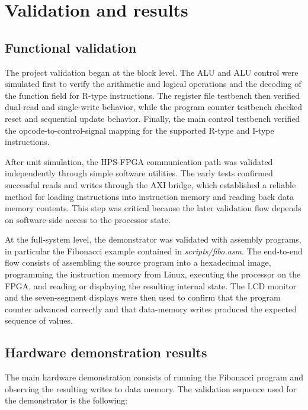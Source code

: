 \documentclass[a4paper,11pt]{scrartcl}
\begin{document}
\section{Validation and results}
\label{sec:org61e2172}
\subsection{Functional validation}
\label{sec:org949a2f6}

The project validation began at the block level. The ALU and ALU control were simulated first to verify the arithmetic and logical operations and the decoding of the function field for R-type instructions. The register file testbench then verified dual-read and single-write behavior, while the program counter testbench checked reset and sequential update behavior. Finally, the main control testbench verified the opcode-to-control-signal mapping for the supported R-type and I-type instructions.

After unit simulation, the HPS-FPGA communication path was validated independently through simple software utilities. The early tests confirmed successful reads and writes through the AXI bridge, which established a reliable method for loading instructions into instruction memory and reading back data memory contents. This step was critical because the later validation flow depends on software-side access to the processor state.

At the full-system level, the demonstrator was validated with assembly programs, in particular the Fibonacci example contained in \emph{scripts/fibo.asm}. The end-to-end flow consists of assembling the source program into a hexadecimal image, programming the instruction memory from Linux, executing the processor on the FPGA, and reading or displaying the resulting internal state. The LCD monitor and the seven-segment displays were then used to confirm that the program counter advanced correctly and that data-memory writes produced the expected sequence of values.
\subsection{Hardware demonstration results}
\label{sec:orgfc5f4cf}

The main hardware demonstration consists of running the Fibonacci program and observing the resulting writes to data memory. The validation sequence used for the demonstrator is the following:
\end{document}
